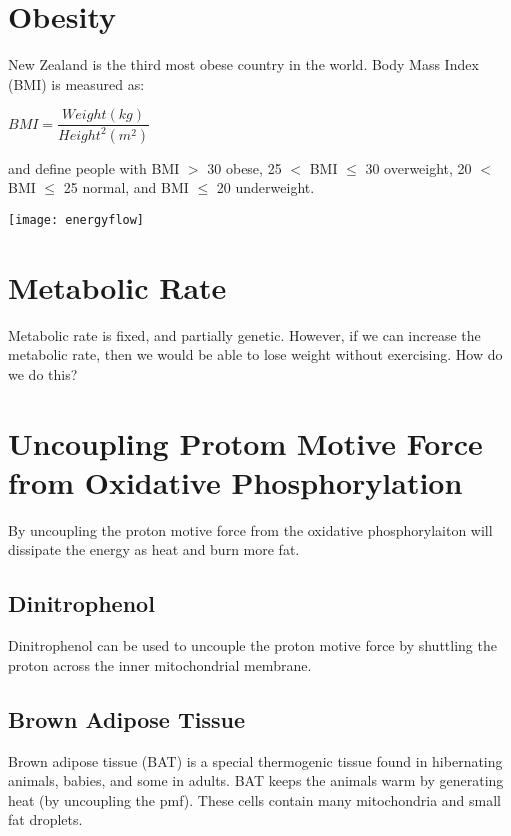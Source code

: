 \section{Obesity}

New Zealand is the third most obese country in the world.
Body Mass Index (BMI) is measured as:
\begin{center}
$BMI = \dfrac{Weight (kg)}{Height^2 (m^2)}$
\end{center}
and define people with BMI $>$ 30 obese, 25 $<$ BMI $\leq$ 30 overweight, 20 $<$ BMI $\leq$ 25 normal, and BMI $\leq$ 20 underweight.

\begin{center}
\texttt{[image: energyflow]}
\end{center}

\section{Metabolic Rate}

Metabolic rate is fixed, and partially genetic.
However, if we can increase the metabolic rate, then we would be able to lose weight without exercising.
How do we do this?

\section{Uncoupling Protom Motive Force from Oxidative Phosphorylation}

By uncoupling the proton motive force from the oxidative phosphorylaiton will dissipate the energy as heat and burn more fat.

\subsection{Dinitrophenol}

Dinitrophenol can be used to uncouple the proton motive force by shuttling the proton across the inner mitochondrial membrane.

\subsection{Brown Adipose Tissue}

Brown adipose tissue (BAT) is a special thermogenic tissue found in hibernating animals, babies, and some in adults.
BAT keeps the animals warm by generating heat (by uncoupling the pmf).
These cells contain many mitochondria and small fat droplets.


